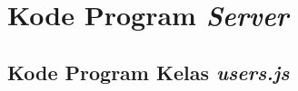 \chapter{Kode Program \textit{Server}}
\label{lamp:B}

%
%
%

\section{Kode Program Kelas \textit{users.js}}


